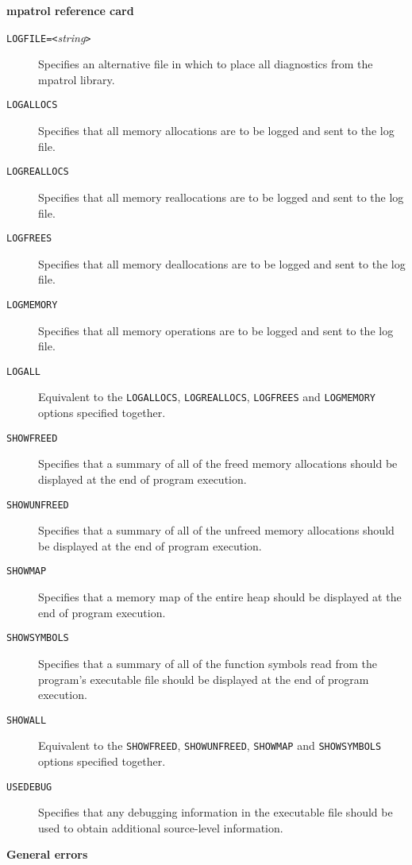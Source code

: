 \documentclass[a4paper,landscape,final]{article}
\newcommand{\heading}[1]{\textbf{\normalsize #1}}
\newcommand{\option}[1]{\texttt{#1}}
\newcommand{\optionpar}[2]{\option{#1}\texttt{=<}\textit{#2}\texttt{>}}
\begin{document}
\begin{multicols}{3}{\textbf{\Large mpatrol reference card}}
\begin{description}
\item[\optionpar{LOGFILE}{string}]
Specifies an alternative file in which to place all diagnostics from the mpatrol
library.
\item[\option{LOGALLOCS}]
Specifies that all memory allocations are to be logged and sent to the log file.
\item[\option{LOGREALLOCS}]
Specifies that all memory reallocations are to be logged and sent to the log
file.
\item[\option{LOGFREES}]
Specifies that all memory deallocations are to be logged and sent to the log
file.
\item[\option{LOGMEMORY}]
Specifies that all memory operations are to be logged and sent to the log file.
\item[\option{LOGALL}]
Equivalent to the \option{LOGALLOCS}, \option{LOGREALLOCS}, \option{LOGFREES}
and \option{LOGMEMORY} options specified together.
\item[\option{SHOWFREED}]
Specifies that a summary of all of the freed memory allocations should be
displayed at the end of program execution.
\item[\option{SHOWUNFREED}]
Specifies that a summary of all of the unfreed memory allocations should be
displayed at the end of program execution.
\item[\option{SHOWMAP}]
Specifies that a memory map of the entire heap should be displayed at the end of
program execution.
\item[\option{SHOWSYMBOLS}]
Specifies that a summary of all of the function symbols read from the program's
executable file should be displayed at the end of program execution.
\item[\option{SHOWALL}]
Equivalent to the \option{SHOWFREED}, \option{SHOWUNFREED}, \option{SHOWMAP} and
\option{SHOWSYMBOLS} options specified together.
\item[\option{USEDEBUG}]
Specifies that any debugging information in the executable file should be used
to obtain additional source-level information.
\end{description}

\vskip 12pt
\heading{General errors}
\vskip 6pt


\end{multicols}
\end{document}
